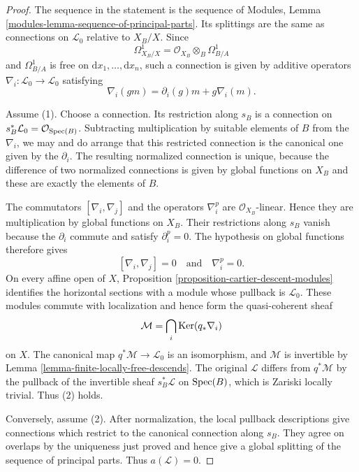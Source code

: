 \begin{proof}
The sequence in the statement is the sequence of
Modules, Lemma \ref{modules-lemma-sequence-of-principal-parts}. Its splittings
are the same as connections on $\mathcal{L}_0$ relative to $X_B/X$. Since
$$
\Omega^1_{X_B/X} =
\mathcal{O}_{X_B} \otimes_B \Omega^1_{B/A}
$$
and $\Omega^1_{B/A}$ is free on $\mathrm{d}x_1, \ldots, \mathrm{d}x_n$,
such a connection is given by additive operators
$\nabla_i : \mathcal{L}_0 \to \mathcal{L}_0$ satisfying
$$
\nabla_i(gm) = \partial_i(g)m + g\nabla_i(m).
$$

Assume (1). Choose a connection. Its restriction along $s_B$ is a connection
on $s_B^*\mathcal{L}_0 = \mathcal{O}_{\mathop{\mathrm{Spec}}(B)}$. Subtracting multiplication
by suitable elements of $B$ from the $\nabla_i$, we may and do arrange that
this restricted connection is the canonical one given by the $\partial_i$.
The resulting normalized connection is unique, because the difference of
two normalized connections is given by global functions on $X_B$ and these
are exactly the elements of $B$.

The commutators $[\nabla_i, \nabla_j]$ and the operators $\nabla_i^p$ are
$\mathcal{O}_{X_B}$-linear. Hence they are multiplication by global functions
on $X_B$. Their restrictions along $s_B$ vanish because the $\partial_i$
commute and satisfy $\partial_i^p = 0$. The hypothesis on global functions
therefore gives
$$
[\nabla_i, \nabla_j] = 0
\quad\text{and}\quad
\nabla_i^p = 0.
$$
On every affine open of $X$, Proposition
\ref{proposition-cartier-descent-modules} identifies the horizontal sections
with a module whose pullback is $\mathcal{L}_0$. These modules commute with
localization and hence form the quasi-coherent sheaf
$$
\mathcal{M} = \bigcap_i \mathop{\mathrm{Ker}}(q_*\nabla_i)
$$
on $X$. The canonical map $q^*\mathcal{M} \to \mathcal{L}_0$ is an
isomorphism, and $\mathcal{M}$ is invertible by
Lemma \ref{lemma-finite-locally-free-descends}.
The original $\mathcal{L}$ differs from $q^*\mathcal{M}$ by the pullback of
the invertible sheaf $s_B^*\mathcal{L}$ on $\mathop{\mathrm{Spec}}(B)$, which is Zariski
locally trivial. Thus (2) holds.

Conversely, assume (2). After normalization, the local pullback
descriptions give connections which restrict to the canonical connection
along $s_B$. They agree on overlaps by the uniqueness just proved and hence
give a global splitting of the sequence of principal parts. Thus
$a(\mathcal{L}) = 0$.
\end{proof}






